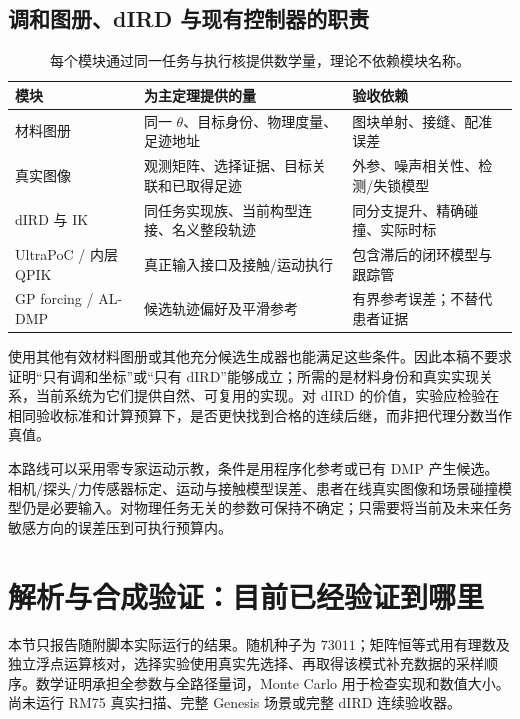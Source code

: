 \documentclass[UTF8,fontset=fandol,zihao=5,a4paper]{ctexart}
\theoremstyle{definition}
\theoremstyle{remark}\newtheorem{remark}[theorem]{说明}
\numberwithin{equation}{section}
\begin{document}
\subsection{调和图册、dIRD 与现有控制器的职责}
\begin{table}[htbp]\centering\small
\begin{tabularx}{\linewidth}{p{.2\linewidth}YY}
\toprule 模块 & 为主定理提供的量 & 验收依赖\\\midrule
材料图册 & 同一 $\theta$、目标身份、物理度量、足迹地址 & 图块单射、接缝、配准误差\\
真实图像 & 观测矩阵、选择证据、目标关联和已取得足迹 & 外参、噪声相关性、检测/失锁模型\\
dIRD 与 IK & 同任务实现族、当前构型连接、名义整段轨迹 & 同分支提升、精确碰撞、实际时标\\
UltraPoC / 内层 QPIK & 真正输入接口及接触/运动执行 & 包含滞后的闭环模型与跟踪管\\
GP forcing / AL-DMP & 候选轨迹偏好及平滑参考 & 有界参考误差；不替代患者证据\\
\bottomrule
\end{tabularx}
\caption{每个模块通过同一任务与执行核提供数学量，理论不依赖模块名称。}
\end{table}
使用其他有效材料图册或其他充分候选生成器也能满足这些条件。因此本稿不要求证明“只有调和坐标”或“只有 dIRD”能够成立；所需的是材料身份和真实实现关系，当前系统为它们提供自然、可复用的实现。对 dIRD 的价值，实验应检验在相同验收标准和计算预算下，是否更快找到合格的连续后继，而非把代理分数当作真值。

本路线可以采用零专家运动示教，条件是用程序化参考或已有 DMP 产生候选。相机/探头/力传感器标定、运动与接触模型误差、患者在线真实图像和场景碰撞模型仍是必要输入。对物理任务无关的参数可保持不确定；只需要将当前及未来任务敏感方向的误差压到可执行预算内。


\section{解析与合成验证：目前已经验证到哪里}
\label{sec:verification73}

本节只报告随附脚本实际运行的结果。随机种子为 $73011$；矩阵恒等式用有理数及独立浮点运算核对，选择实验使用真实先选择、再取得该模式补充数据的采样顺序。数学证明承担全参数与全路径量词，Monte Carlo 用于检查实现和数值大小。尚未运行 RM75 真实扫描、完整 Genesis 场景或完整 dIRD 连续验收器。
\end{document}
